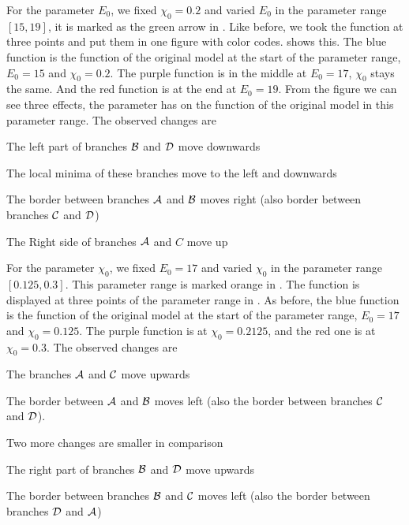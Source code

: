 For the parameter $E_0$, we fixed $\chi_0 = 0.2$ and varied $E_0$ in the parameter range $[15, 19]$, it is marked as the green arrow in .
Like before, we took the function at three points and put them in one figure with color codes.
 shows this.
The blue function is the function of the original model at the start of the parameter range, $E_0 = 15$ and $\chi_0 = 0.2$.
The purple function is in the middle at $E_0 = 17$, $\chi_0$ stays the same.
And the red function is at the end at $E_0 = 19$.
From the figure we can see three effects, the parameter has on the function of the original model in this parameter range.
The observed changes are
\begin{enumerate*}
    \item The left part of branches $\mathcal{B}$ and $\mathcal{D}$ move downwards
    \item The local minima of these branches move to the left and downwards
    \item The border between branches $\mathcal{A}$ and $\mathcal{B}$ moves right (also border between branches $\mathcal{C}$ and $\mathcal{D}$)
    \item The Right side of branches $\mathcal{A}$ and $C$ move up 
\end{enumerate*}

For the parameter $\chi_0$, we fixed $E_0 = 17$ and varied $\chi_0$ in the parameter range $[0.125, 0.3]$.
This parameter range is marked orange in .
The function is displayed at three points of the parameter range in .
As before, the blue function is the function of the original model at the start of the parameter range, $E_0 = 17$ and $\chi_0 = 0.125$.
The purple function is at $\chi_0 = 0.2125$, and the red one is at $\chi_0 = 0.3$.
The observed changes are
\begin{enumerate*}
    \item The branches $\mathcal{A}$ and $\mathcal{C}$ move upwards
    \item The border between $\mathcal{A}$ and $\mathcal{B}$ moves left (also the border between branches $\mathcal{C}$ and $\mathcal{D}$).
\end{enumerate*}
Two more changes are smaller in comparison
\begin{enumerate*}
    \item The right part of branches $\mathcal{B}$ and $\mathcal{D}$ move upwards
    \item The border between branches $\mathcal{B}$ and $\mathcal{C}$ moves left (also the border between branches $\mathcal{D}$ and $\mathcal{A}$)
\end{enumerate*}

